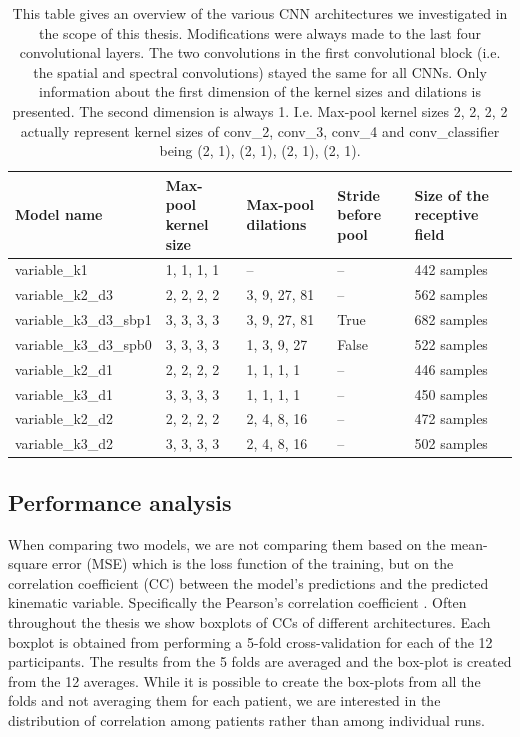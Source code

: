 \begin{table}[!htpb]
\centering
\begin{tabular}{|p{3.7cm}|p{1.7cm}|p{2cm}|p{1.2cm}|p{2.5cm}|}
\toprule
Model name & Max-pool kernel size & Max-pool dilations & Stride before pool & Size of the receptive field \\
\midrule
variable\_k1 & 1, 1, 1, 1 & -- & -- & 442 samples \\
\hline
variable\_k2\_d3 & 2, 2, 2, 2 & 3, 9, 27, 81 & -- & 562 samples \\
\hline
variable\_k3\_d3\_sbp1 & 3, 3, 3, 3 & 3, 9, 27, 81 & True & 682 samples \\
\hline
variable\_k3\_d3\_spb0 & 3, 3, 3, 3  & 1, 3, 9, 27 & False & 522 samples \\
\hline
variable\_k2\_d1 & 2, 2, 2, 2 & 1, 1, 1, 1 & -- & 446 samples \\
\hline
variable\_k3\_d1 & 3, 3, 3, 3  & 1, 1, 1, 1 & -- & 450 samples \\
\hline
variable\_k2\_d2 & 2, 2, 2, 2 & 2, 4, 8, 16 & -- & 472 samples \\
\hline
variable\_k3\_d2 & 3, 3, 3, 3 & 2, 4, 8, 16 & -- & 502 samples \\
\hline
\bottomrule
\end{tabular}
\caption[Architectural modifications]{This table gives an overview of the various CNN architectures we investigated in the scope of this thesis. Modifications were always made to the last four convolutional layers. The two convolutions in the first convolutional block (i.e. the spatial and spectral convolutions) stayed the same for all CNNs. Only information about the first dimension of the kernel sizes and dilations is presented. The second dimension is always 1. I.e. Max-pool kernel sizes 2, 2, 2, 2 actually represent kernel sizes of conv\_2, conv\_3, conv\_4 and conv\_classifier being (2, 1), (2, 1), (2, 1), (2, 1). }
\end{table}\label{tab:architectures-description}

\subsection{Performance analysis}\label{subsec:performance-analysis}
When comparing two models, we are not comparing them based on the mean-square error (MSE) which is the loss function of the training, but on the correlation coefficient (CC) between the model's predictions and the predicted kinematic variable.
Specifically the Pearson's correlation coefficient \cite{pearson-vii-1895}.
Often throughout the thesis we show boxplots of CCs of different architectures.
Each boxplot is obtained from performing a 5-fold cross-validation for each of the 12 participants.
The results from the 5 folds are averaged and the box-plot is created from the 12 averages.
While it is possible to create the box-plots from all the folds and not averaging them for each patient, we are interested in the distribution of correlation among patients rather than among individual runs.